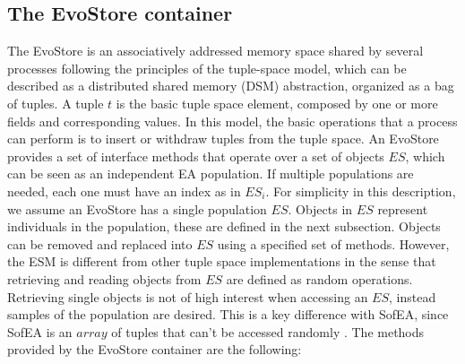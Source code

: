 \subsection{The EvoStore container}
\label{sss:container}
The EvoStore is an associatively addressed memory space shared by several processes following the principles of the tuple-space model, which can be described as a distributed shared memory (DSM) abstraction, organized as a bag of tuples.
A tuple $t$ is the basic tuple space element, composed by one or more fields and corresponding values. In this model, the basic operations that a process can perform is to insert or withdraw tuples from the tuple space. %
An EvoStore provides a set of interface methods that operate over a set of objects $ES$, which can be seen as an independent EA population. If multiple populations are needed, each one must have an index as in $ES_i$. For simplicity in this description, we assume an EvoStore has a single population $ES$. Objects in $ES$ represent individuals in the population, these are defined in the next subsection. Objects can be removed and replaced into $ES$ using a specified set of methods. However, the ESM is different from other tuple space implementations in the sense that retrieving and reading objects from $ES$ are defined as random operations. Retrieving single objects is not of high interest when accessing an $ES$, instead samples of the population are desired.  This is a key difference with SofEA, since SofEA is an $array$ of tuples that can't be accessed randomly \cite{sofea1,sofea2}. The methods provided by the EvoStore container are the following:


